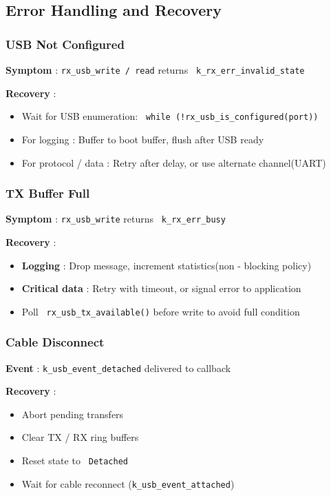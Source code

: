 \subsection{Error Handling and Recovery}

\subsubsection{USB Not Configured}

\textbf{Symptom} : \texttt{rx\_usb\_write / read} returns \texttt {
  k\_rx\_err\_invalid\_state
}

\textbf{Recovery} :
\begin{itemize}
\item Wait for USB enumeration: \texttt{
  while (!rx\_usb\_is\_configured(port))
}
\item For logging : Buffer to boot buffer, flush after USB ready
\item For protocol / data : Retry after delay, or use alternate channel(UART)
\end{itemize}

\subsubsection{TX Buffer Full}

\textbf{Symptom} : \texttt{rx\_usb\_write} returns \texttt {
  k\_rx\_err\_busy
}

\textbf{Recovery} :
\begin{itemize}
\item \textbf{Logging} : Drop message,
                         increment
                         statistics(non - blocking policy)
\item \textbf{Critical data}
    : Retry with timeout,
      or signal error to application
\item Poll \texttt{
             rx\_usb\_tx\_available()} before write to avoid full condition
\end{itemize}

\subsubsection{Cable Disconnect}

\textbf{Event} : \texttt{k\_usb\_event\_detached} delivered to callback

\textbf{Recovery} :
\begin{itemize}
\item Abort pending transfers
\item Clear TX / RX ring buffers
\item Reset state to \texttt {
  Detached
}
\item Wait for cable reconnect (\texttt{k\_usb\_event\_attached})
\end{itemize}

